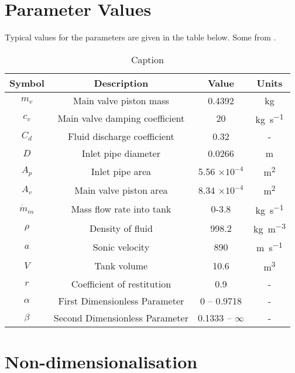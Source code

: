 \section{Parameter Values}

Typical values for the parameters are given in the table below. Some from \cite{Hos2016DynamicService}.

\begin{table}[ht]
    \centering
    \begin{tabular}{c|c|c|c}
        Symbol & Description & Value & Units \\ \hline \hline
        $m_v$ & Main valve piston mass & 0.4392 & \si{kg} \\ \hline %
        $c_v$ & Main valve damping coefficient & 20 & \si{kg.s^{-1}} \\ \hline %
        $C_d$ & Fluid discharge coefficient & 0.32 & - \\ \hline %
        $D$ & Inlet pipe diameter & 0.0266 & \si{m} \\ \hline %
        $A_p$ & Inlet pipe area & 5.56 $\times 10^{-4}$ & \si{m^2} \\ \hline
        $A_v$ & Main valve piston area & 8.34 $\times 10^{-4}$ & \si{m^2} \\ \hline
        $\dot{m}_{in}$ & Mass flow rate into tank & 0-3.8 & \si{kg.s^{-1}} \\ \hline %
        $\rho$ & Density of fluid & 998.2 & \si{kg.m^{-3}} \\ \hline %
        $a$ & Sonic velocity & 890 & \si{m.s^{-1}} \\ \hline %
        $V$ & Tank volume & 10.6 & \si{m^3} \\ \hline %
        $r$ & Coefficient of restitution & 0.9 & - \\ \hline \hline %
        $\alpha$ & First Dimensionless Parameter & 0 -- 0.9718 & - \\ \hline
        $\beta$ & Second Dimensionless Parameter & 0.1333 -- $\infty$ & - \\ %
    \end{tabular}
    \caption{Caption}
    \label{tab:my_label}
\end{table}

\section{Non-dimensionalisation}

